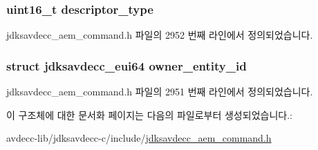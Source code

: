 \subsubsection[{\texorpdfstring{descriptor\+\_\+type}{descriptor_type}}]{\setlength{\rightskip}{0pt plus 5cm}uint16\+\_\+t descriptor\+\_\+type}\hypertarget{structjdksavdecc__aem__command__acquire__entity__response_ab7c32b6c7131c13d4ea3b7ee2f09b78d}{}\label{structjdksavdecc__aem__command__acquire__entity__response_ab7c32b6c7131c13d4ea3b7ee2f09b78d}


jdksavdecc\+\_\+aem\+\_\+command.\+h 파일의 2952 번째 라인에서 정의되었습니다.

\subsubsection[{\texorpdfstring{owner\+\_\+entity\+\_\+id}{owner_entity_id}}]{\setlength{\rightskip}{0pt plus 5cm}struct {\bf jdksavdecc\+\_\+eui64} owner\+\_\+entity\+\_\+id}\hypertarget{structjdksavdecc__aem__command__acquire__entity__response_aae4e95a44a1a5e23f8e4415c32aed989}{}\label{structjdksavdecc__aem__command__acquire__entity__response_aae4e95a44a1a5e23f8e4415c32aed989}


jdksavdecc\+\_\+aem\+\_\+command.\+h 파일의 2951 번째 라인에서 정의되었습니다.



이 구조체에 대한 문서화 페이지는 다음의 파일로부터 생성되었습니다.\+:\begin{DoxyCompactItemize}
\item 
avdecc-\/lib/jdksavdecc-\/c/include/\hyperlink{jdksavdecc__aem__command_8h}{jdksavdecc\+\_\+aem\+\_\+command.\+h}\end{DoxyCompactItemize}
